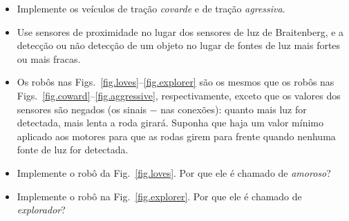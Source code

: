 \begin{framed}
\begin{itemize}
\item Implemente os veículos de tração \emph{covarde} e de tração \emph{agressiva}.
\item Use sensores de proximidade no lugar dos sensores de luz de Braitenberg, e a detecção ou não detecção de um objeto no lugar de fontes de luz mais fortes ou mais fracas.
\item Os robôs nas Figs.~\ref{fig.loves}--\ref{fig.explorer} são os mesmos que os robôs nas Figs.~\ref{fig.coward}--\ref{fig.aggressive}, respectivamente, exceto que os valores dos sensores são negados (os sinais $-$ nas conexões): quanto mais luz for detectada, mais lenta a roda girará. Suponha que haja um valor mínimo aplicado aos motores para que as rodas girem para frente quando nenhuma fonte de luz for detectada.
\item Implemente o robô da Fig.~\ref{fig.loves}. Por que ele é chamado de \emph{amoroso}?
\item Implemente o robô na Fig.~\ref{fig.explorer}. Por que ele é chamado de \emph{explorador}?
\end{itemize}
\end{framed}

